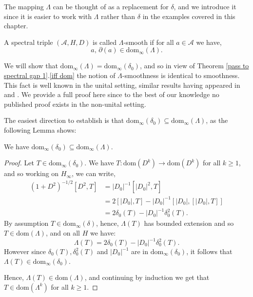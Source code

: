     The mapping $\Lambda$ can be thought of as a replacement for $\delta$, and we introduce it since it is easier to work with $\Lambda$ rather than $\delta$
    in the examples covered in this chapter.
    \begin{defi}
        A spectral triple $(\mathcal{A},H,D)$ is called $\Lambda$-smooth if for all $a \in \mathcal{A}$ we have,
        \begin{equation*}
            a,\,\partial(a) \in \mathrm{dom}_\infty(\Lambda).
        \end{equation*}
    \end{defi}
    We will show that $\mathrm{dom}_\infty(\Lambda) = \mathrm{dom}_\infty(\delta_0)$, and so in view of Theorem \ref{pass to spectral gap 1}.\eqref{iff dom} the notion of
    $\Lambda$-smoothness is identical to smoothness. {  This fact is well known in the unital setting, similar results having appeared in \cite[Appendix B]{Connes-Moscovici} and \cite[Proposition 6.5]{CPRS2}. We
    provide a full proof here since to the best of our knowledge no published proof exists in the non-unital setting.}
    
    The easiest direction to establish is that $\mathrm{dom}_\infty(\delta_0)\subseteq \mathrm{dom}_\infty(\Lambda)$, as the following Lemma shows:
    \begin{lem}\label{delta smooth implies lambda smooth}
        We have $\mathrm{dom}_\infty(\delta_0) \subseteq \mathrm{dom}_\infty(\Lambda)$.
    \end{lem}
    \begin{proof}
        Let $T \in \mathrm{dom}_\infty(\delta_0)$. We have $T:\mathrm{dom}(D^k)\to \mathrm{dom}(D^k)$ for all $k\geq 1$, and so working on $H_\infty$, we can write,
        \begin{align*}
            (1+D^2)^{-1/2}[D^2,T]  &= |D_0|^{-1}[|D_0|^2,T]\\
                                   &= 2[|D_0|,T]-|D_0|^{-1}[|D_0|,[|D_0|,T]]\\
                                   &= 2\delta_0(T)-|D_0|^{-1}\delta_0^2(T).
        \end{align*}
        By assumption $T \in \mathrm{dom}_{\infty}(\delta)$, hence, $\Lambda(T)$ has bounded extension
        and so $T \in \mathrm{dom}(\Lambda)$, and on all $H$ we have:
        \begin{equation*}
            \Lambda(T) = 2\delta_0(T)-|D_0|^{-1}\delta_0^2(T).
        \end{equation*}
        However since $\delta_0(T), \delta_0^2(T)$ and $|D_0|^{-1}$ are in $\mathrm{dom}_\infty(\delta_0)$, it follows that $\Lambda(T) \in \mathrm{dom}_\infty(\delta_0)$.
        
        Hence, $\Lambda(T) \in \mathrm{dom}(\Lambda)$, and continuing by induction we get that $T \in \mathrm{dom}(\Lambda^k)$ for all $k\geq 1$.
    \end{proof}
    
